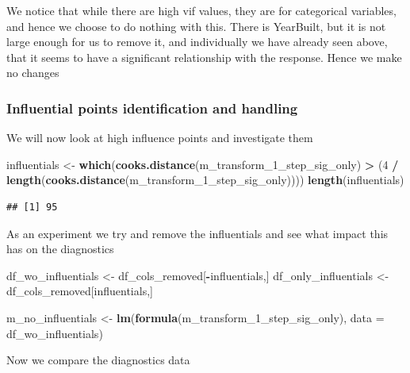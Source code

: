\documentclass[
]{article}
\newenvironment{Shaded}{\begin{snugshade}}{\end{snugshade}}
\newcommand{\DataTypeTok}[1]{\textcolor[rgb]{0.13,0.29,0.53}{#1}}
\newcommand{\DecValTok}[1]{\textcolor[rgb]{0.00,0.00,0.81}{#1}}
\newcommand{\KeywordTok}[1]{\textcolor[rgb]{0.13,0.29,0.53}{\textbf{#1}}}
\newcommand{\NormalTok}[1]{#1}
\newcommand{\OperatorTok}[1]{\textcolor[rgb]{0.81,0.36,0.00}{\textbf{#1}}}
\newcommand{\StringTok}[1]{\textcolor[rgb]{0.31,0.60,0.02}{#1}}
\begin{document}
We notice that while there are high vif values, they are for categorical variables, and hence we choose to do nothing with this. There is YearBuilt, but it is not large enough for us to remove it, and individually we have already seen above, that it seems to have a significant relationship with the response. Hence we make no changes

\hypertarget{influential-points-identification-and-handling}{%
\subsubsection{Influential points identification and handling}\label{influential-points-identification-and-handling}}

We will now look at high influence points and investigate them

\begin{Shaded}
\begin{Highlighting}[]
\NormalTok{influentials <-}\StringTok{ }\KeywordTok{which}\NormalTok{(}\KeywordTok{cooks.distance}\NormalTok{(m_transform_}\DecValTok{1}\NormalTok{_step_sig_only) }\OperatorTok{>}\StringTok{ }\NormalTok{(}\DecValTok{4} \OperatorTok{/}\StringTok{ }\KeywordTok{length}\NormalTok{(}\KeywordTok{cooks.distance}\NormalTok{(m_transform_}\DecValTok{1}\NormalTok{_step_sig_only))))}
\KeywordTok{length}\NormalTok{(influentials)}
\end{Highlighting}
\end{Shaded}

\begin{verbatim}
## [1] 95
\end{verbatim}

As an experiment we try and remove the influentials and see what impact this has on the diagnostics

\begin{Shaded}
\begin{Highlighting}[]
\NormalTok{df_wo_influentials <-}\StringTok{ }\NormalTok{df_cols_removed[}\OperatorTok{-}\NormalTok{influentials,]}
\NormalTok{df_only_influentials <-}\StringTok{ }\NormalTok{df_cols_removed[influentials,]}

\NormalTok{m_no_influentials <-}\StringTok{ }\KeywordTok{lm}\NormalTok{(}\KeywordTok{formula}\NormalTok{(m_transform_}\DecValTok{1}\NormalTok{_step_sig_only), }\DataTypeTok{data =}\NormalTok{ df_wo_influentials)}
\end{Highlighting}
\end{Shaded}

Now we compare the diagnostics data
\end{document}
